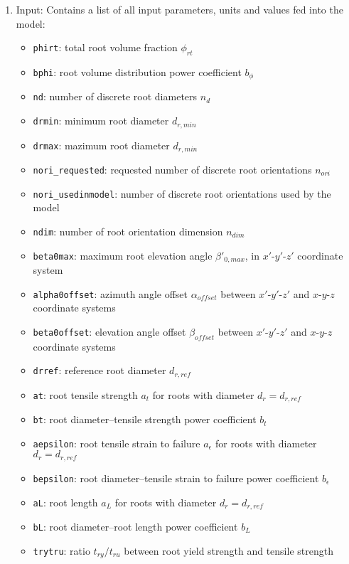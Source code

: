 \documentclass[a4 paper, 11  pt]{article}
\begin{document}
\begin{enumerate}
	\parskip=1pt
	\itemsep=0pt
	\item Input: Contains a list of all input parameters, units and values fed into the model:
		\begin{itemize}
		\parskip=0pt
		\itemsep=0pt
		\item \texttt{phirt}: total root volume fraction $\phi_{rt}$
		\item \texttt{bphi}: root volume distribution power coefficient $b_\phi$
		\item \texttt{nd}: number of discrete root diameters $n_d$
		\item \texttt{drmin}: minimum root diameter $d_{r,min}$
		\item \texttt{drmax}: mazimum root diameter $d_{r,min}$
		\item \texttt{nori\_requested}: requested number of discrete root orientations $n_{ori}$
		\item \texttt{nori\_usedinmodel}: number of discrete root orientations used by the model
		\item \texttt{ndim}: number of root orientation dimension $n_{dim}$
		\item \texttt{beta0max}: maximum root elevation angle $\beta'_{0,max}$, in $x'$-$y'$-$z'$ coordinate system
		\item \texttt{alpha0offset}: azimuth angle offset $\alpha_{offset}$ between $x'$-$y'$-$z'$ and $x$-$y$-$z$ coordinate systems
		\item \texttt{beta0offset}: elevation angle offset $\beta_{offset}$ between $x'$-$y'$-$z'$ and $x$-$y$-$z$ coordinate systems
		\item \texttt{drref}: reference root diameter $d_{r,ref}$
		\item \texttt{at}: root tensile strength $a_t$ for roots with diameter $d_r=d_{r,ref}$
		\item \texttt{bt}: root diameter--tensile strength power coefficient $b_t$
		\item \texttt{aepsilon}: root tensile strain to failure $a_\epsilon$ for roots with diameter $d_r=d_{r,ref}$
		\item \texttt{bepsilon}: root diameter--tensile strain to failure power coefficient $b_\epsilon$
		\item \texttt{aL}: root length $a_L$ for roots with diameter $d_r=d_{r,ref}$
		\item \texttt{bL}: root diameter--root length power coefficient $b_L$
		\item \texttt{trytru}: ratio $t_{ry}/t_{ru}$ between root yield strength and tensile strength

\end{itemize}
\end{enumerate}
\end{document}
